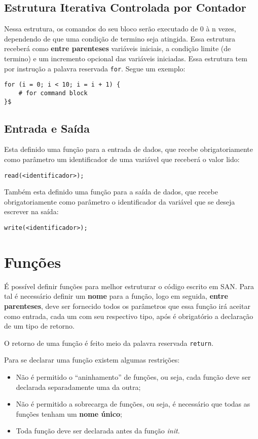 \documentclass[a4paper,11pt]{article}
\begin{document}
\subsection{Estrutura Iterativa Controlada por Contador}
Nessa estrutura, os comandos do seu bloco serão executado de 0 à n vezes, dependendo de que
uma condição de termino seja atingida. Essa estrutura receberá como \textbf{entre parenteses}
variáveis iniciais, a condição limite (de termino) e um incremento opcional das variáveis
iniciadas. Essa estrutura tem por instrução a palavra reservada \texttt{for}. Segue um exemplo:
\begin{lstlisting}
for (i = 0; i < 10; i = i + 1) {
    # for command block
}$
\end{lstlisting}

\subsection{Entrada e Saída}
Esta definido uma função para a entrada de dados, que recebe obrigatoriamente como parâmetro
um identificador de uma variável que receberá o valor lido:
\begin{lstlisting}
read(<identificador>);
\end{lstlisting}

Também esta definido uma função para a saída de dados, que recebe obrigatoriamente como
parâmetro o identificador da variável que se deseja escrever na saída:
\begin{lstlisting}
write(<identificador>);
\end{lstlisting}

\section{Funções}
É possível definir funções para melhor estruturar o código escrito em SAN. Para tal é necessário
definir um \textbf{nome} para a função, logo em seguida, \textbf{entre parenteses}, deve ser
fornecido todos os parâmetros que essa função irá aceitar como entrada, cada um com seu respectivo
tipo, após é obrigatório a declaração de um tipo de retorno.

O retorno de uma função é feito meio da palavra reservada \texttt{return}.

Para se declarar uma função existem algumas restrições:
\begin{itemize}
    \item Não é permitido o ``aninhamento'' de funções, ou seja, cada função deve ser declarada
    separadamente uma da outra;
    \item Não é permitido a sobrecarga de funções, ou seja, é necessário que todas as funções
    tenham um \textbf{nome único};
    \item Toda função deve ser declarada antes da função \textit{init}.
\end{itemize}
\end{document}
